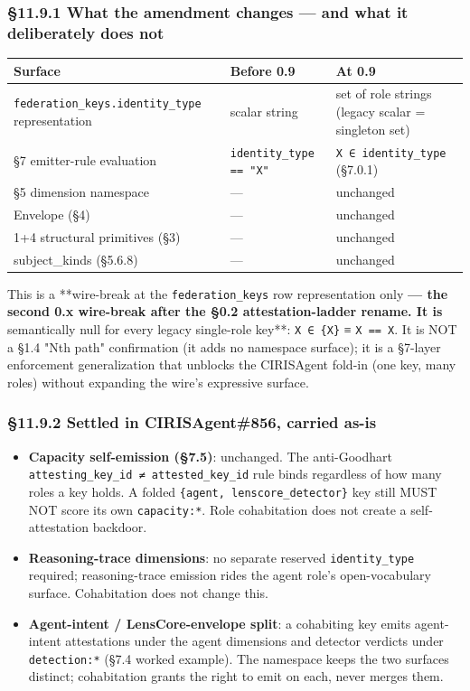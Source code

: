 \documentclass[11pt]{article}
\begin{document}
\subsubsection*{§11.9.1 What the amendment changes — and what it deliberately does not}


{\footnotesize
\begin{longtable}{|p{5.33cm}|p{5.33cm}|p{5.33cm}|}\hline
\textbf{Surface} & \textbf{Before 0.9} & \textbf{At 0.9} \\ \hline\endhead
\texttt{federation\_keys.identity\_type} representation & scalar string & set of role strings (legacy scalar = singleton set) \\ \hline
§7 emitter-rule evaluation & \texttt{identity\_type == "X"} & \texttt{X ∈ identity\_type} (§7.0.1) \\ \hline
§5 dimension namespace & — & unchanged \\ \hline
Envelope (§4) & — & unchanged \\ \hline
1+4 structural primitives (§3) & — & unchanged \\ \hline
subject\_kinds (§5.6.8) & — & unchanged \\ \hline
\end{longtable}}


This is a **wire-break at the \texttt{federation\_keys} row representation only\textbf{ — the second 0.x wire-break after the §0.2 attestation-ladder rename. It is }semantically null for every legacy single-role key**: \texttt{X ∈ \{X\}} ≡ \texttt{X == X}. It is NOT a §1.4 "Nth path" confirmation (it adds no namespace surface); it is a §7-layer enforcement generalization that unblocks the CIRISAgent fold-in (one key, many roles) without expanding the wire's expressive surface.


\subsubsection*{§11.9.2 Settled in CIRISAgent\#856, carried as-is}


\begin{itemize}\setlength\itemsep{0pt}
\item \textbf{Capacity self-emission (§7.5)}: unchanged. The anti-Goodhart \texttt{attesting\_key\_id ≠ attested\_key\_id} rule binds regardless of how many roles a key holds. A folded \texttt{\{agent, lenscore\_detector\}} key still MUST NOT score its own \texttt{capacity:*}. Role cohabitation does not create a self-attestation backdoor.
\item \textbf{Reasoning-trace dimensions}: no separate reserved \texttt{identity\_type} required; reasoning-trace emission rides the agent role's open-vocabulary surface. Cohabitation does not change this.
\item \textbf{Agent-intent / LensCore-envelope split}: a cohabiting key emits agent-intent attestations under the agent dimensions and detector verdicts under \texttt{detection:*} (§7.4 worked example). The namespace keeps the two surfaces distinct; cohabitation grants the right to emit on each, never merges them.
\end{itemize}
\end{document}
